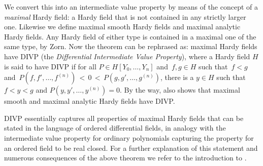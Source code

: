 \documentclass[]{amsart}
\numberwithin{equation}{section}
\theoremstyle{definition}
\theoremstyle{remark}
\begin{document}
\noindent
We convert this into an intermediate value property by means of the concept of
a {\it maximal}\/ Hardy field: a Hardy field that is not contained in any strictly
larger one. Likewise we define maximal smooth Hardy fields and maximal analytic Hardy fields.
Any Hardy field of either type is contained in a maximal one of the same type, by Zorn.
Now the theorem can be rephrased as: maximal Hardy
fields have DIVP (the {\it Differential Intermediate Value Property}\/), where a Hardy field $H$ is said to have DIVP if
for all $P\in H[Y_0,\dots,Y_n]$ and~$f,g \in H$ such that~$f<g$ and~${P(f,f',\dots,f^{(n)})\, <\, 0\, <\, P(g,g',\dots,g^{(n)})}$,
there is a $y\in H$ such that~${f<y<g}$ and $P(y,y',\dots,y^{(n)})=0$.  By the way, \cite{ADH2} also shows that maximal smooth and maximal analytic Hardy fields have DIVP.

DIVP  essentially captures all properties of maximal Hardy fields that
can be stated in the language of ordered differential fields, in
analogy with the intermediate value property for ordinary polynomials
capturing the property for an ordered field to be real closed. For a
further explanation of this statement and numerous consequences of the
above theorem we refer to the introduction to \cite{ADH2}.
\end{document}
